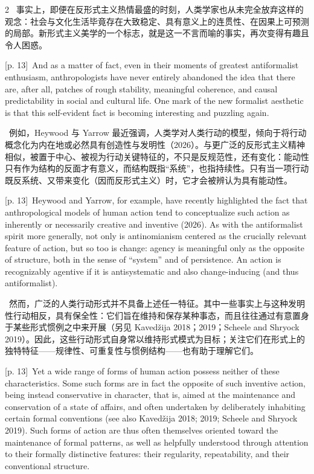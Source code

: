 \documentclass[10pt,a4paper]{article}
\begin{document}
\begin{paracol}{2}
\switchcolumn*
{\scriptsize\color{gray} [p. 13]}\ 事实上，即便在反形式主义热情最盛的时刻，人类学家也从未完全放弃这样的观念：社会与文化生活毕竟存在大致稳定、具有意义上的连贯性、在因果上可预测的局部。新形式主义美学的一个标志，就是这一不言而喻的事实，再次变得有趣且令人困惑。\par
\switchcolumn
{\scriptsize\color{gray} [p. 13]}\ And as a matter of fact, even in their moments of greatest antiformalist enthusiasm, anthropologists have never entirely abandoned the idea that there are, after all, patches of rough stability, meaningful coherence, and causal predictability in social and cultural life. One mark of the new formalist aesthetic is that this self-evident fact is becoming interesting and puzzling again.\par
\switchcolumn*
{\scriptsize\color{gray} [p. 13]}\ 例如，Heywood 与 Yarrow 最近强调，人类学对人类行动的模型，倾向于将行动概念化为内在地或必然具有创造性与发明性（2026）。与更广泛的反形式主义精神相似，被置于中心、被视为行动关键特征的，不只是反规范性，还有变化：能动性只有作为结构的反面才有意义，而结构既指“系统”，也指持续性。只有当一项行动既反系统、又带来变化（因而反形式主义）时，它才会被辨认为具有能动性。\par
\switchcolumn
{\scriptsize\color{gray} [p. 13]}\ Heywood and Yarrow, for example, have recently highlighted the fact that anthropological models of human action tend to conceptualize such action as inherently or necessarily creative and inventive (2026). As with the antiformalist spirit more generally, not only is antinomianism centered as the crucially relevant feature of action, but so too is change: agency is meaningful only as the opposite of structure, both in the sense of “system” and of persistence. An action is recognizably agentive if it is antisystematic and also change-inducing (and thus antiformalist).\par
\switchcolumn*
{\scriptsize\color{gray} [p. 13]}\ 然而，广泛的人类行动形式并不具备上述任一特征。其中一些事实上与这种发明性行动相反，具有保全性：它们旨在维持和保存某种事态，而且往往通过有意置身于某些形式惯例之中来开展（另见 Kavedžija 2018；2019；Scheele and Shryock 2019）。因此，这些行动形式自身常以维持形式模式为目标；关注它们在形式上的独特特征——规律性、可重复性与惯例结构——也有助于理解它们。\par
\switchcolumn
{\scriptsize\color{gray} [p. 13]}\ Yet a wide range of forms of human action possess neither of these characteristics. Some such forms are in fact the opposite of such inventive action, being instead conservative in character, that is, aimed at the maintenance and conservation of a state of affairs, and often undertaken by deliberately inhabiting certain formal conventions (see also Kavedžija 2018; 2019; Scheele and Shryock 2019). Such forms of action are thus often themselves oriented toward the maintenance of formal patterns, as well as helpfully understood through attention to their formally distinctive features: their regularity, repeatability, and their conventional structure.\par

\end{paracol}
\end{document}
